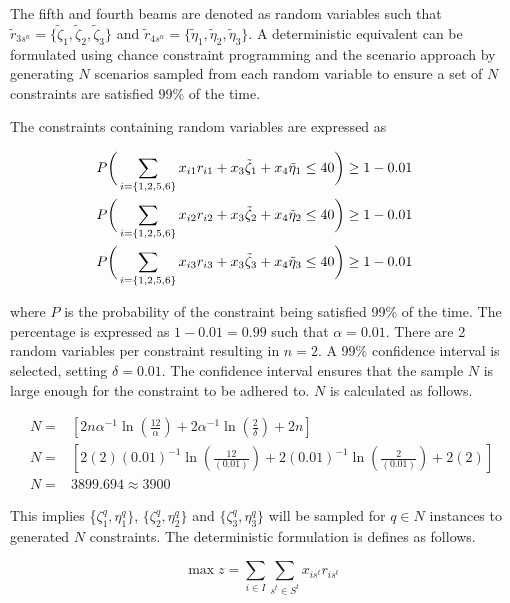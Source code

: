 \documentclass[a4paper,11pt]{article}
\begin{document}
\vspace{12pt}

The fifth and fourth beams are denoted as random variables such that $\tilde{r}_{3s^n} = \{\tilde{\zeta}_1,\tilde{\zeta}_2,\tilde{\zeta}_3\}$ and $\tilde{r}_{4s^n} = \{\tilde{\eta}_1,\tilde{\eta}_2,\tilde{\eta}_3\}$. A deterministic equivalent can be formulated using chance constraint programming and the scenario approach by generating $N$ scenarios sampled from each random variable to ensure a set of $N$ constraints are satisfied 99\% of the time.

The constraints containing random variables are expressed as

\begin{align}
	P\bigg{(}\sum_{i =\{1,2,5,6\}}x_{i1}r_{i1} +x_{3}\tilde{\zeta}_1+ x_{4}\tilde{\eta}_1\leq 40 \bigg{)} \geq 1-0.01&& \\
	P\bigg{(}\sum_{i =\{1,2,5,6\}}x_{i2}r_{i2} +x_{3}\tilde{\zeta}_2+ x_{4}\tilde{\eta}_2\leq 40 \bigg{)} \geq 1-0.01&& \\
	P\bigg{(}\sum_{i =\{1,2,5,6\}}x_{i3}r_{i3} +x_{3}\tilde{\zeta}_3+ x_{4}\tilde{\eta}_3\leq 40 \bigg{)} \geq 1-0.01&&
\end{align}

where $P$ is the probability of the constraint being satisfied 99\% of the time. The percentage is expressed as $1-0.01 = 0.99$ such that $\alpha = 0.01$. There are 2 random variables per constraint resulting in $n=2$. A 99\% confidence interval is selected, setting $\delta = 0.01$. The confidence interval ensures that the sample $N$ is large enough for the constraint to be adhered to. $N$ is calculated as follows.

\begin{align}
	N=&[ 2n\alpha^{-1}\ln(\frac{12}{\alpha}) + 2\alpha^{-1}\ln(\frac{2}{\delta})+2n] \\
	N=&[ 2(2)(0.01)^{-1}\ln(\frac{12}{(0.01)}) + 2(0.01)^{-1}\ln(\frac{2}{(0.01)})+2(2)]\\
	N=&3899.694\approx3900
\end{align}

This implies  \{$\zeta_1^q,\eta_1^q\}$, $\{\zeta_2^q,\eta_2^q\}$ and $\{\zeta_3^q,\eta_3^q\}$ will be sampled for $q\in N$ instances to generated $N$ constraints. The deterministic formulation is defines as follows.

\begin{equation}
	\max z = \sum_{i\in I}\sum_{s^t \in S^t} x_{is^t}r_{is^t}
\end{equation}
\end{document}
